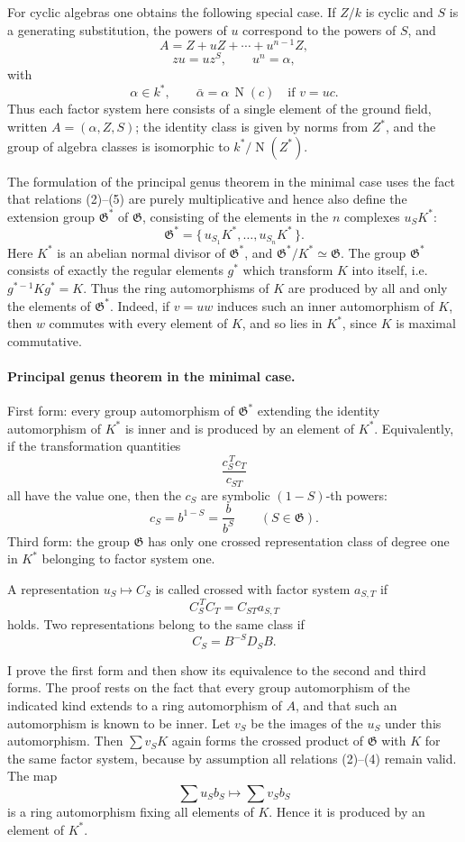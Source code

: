 \documentclass[11pt]{article}
\providecommand{\Norm}{\operatorname{N}}
\providecommand{\Gg}{\mathfrak G}
\begin{document}
For cyclic algebras one obtains the following special case. If \(Z/k\) is cyclic and \(S\) is a generating substitution, the powers of \(u\) correspond to the powers of \(S\), and
\[
        A=Z+uZ+\cdots+u^{n-1}Z,                              \tag{1'}
\]
\[
        zu=uz^S,\qquad u^n=\alpha,                            \tag{2'--3'}
\]
with
\[
        \alpha\in k^*,\qquad
        \bar\alpha=\alpha\,\Norm(c)\quad\text{if }v=uc .       \tag{4'--5'}
\]
Thus each factor system here consists of a single element of the ground field, written \(A=(\alpha,Z,S)\); the identity class is given by norms from \(Z^*\), and the group of algebra classes is isomorphic to \(k^*/\Norm(Z^*)\).

The formulation of the principal genus theorem in the minimal case uses the fact that relations (2)--(5) are purely multiplicative and hence also define the extension group \(\Gg^*\) of \(\Gg\), consisting of the elements in the \(n\) complexes \(u_SK^*\):
\[
        \Gg^*=\{\,u_{S_1}K^*,\ldots,u_{S_n}K^*\,\}.            \tag{6}
\]
Here \(K^*\) is an abelian normal divisor of \(\Gg^*\), and \(\Gg^*/K^*\simeq\Gg\). The group \(\Gg^*\) consists of exactly the regular elements \(g^*\) which transform \(K\) into itself, i.e. \(g^{*-1}Kg^*=K\). Thus the ring automorphisms of \(K\) are produced by all and only the elements of \(\Gg^*\). Indeed, if \(v=uw\) induces such an inner automorphism of \(K\), then \(w\) commutes with every element of \(K\), and so lies in \(K^*\), since \(K\) is maximal commutative.

\paragraph{Principal genus theorem in the minimal case.}
First form: every group automorphism of \(\Gg^*\) extending the identity automorphism of \(K^*\) is inner and is produced by an element of \(K^*\). Equivalently, if the transformation quantities
\[
        \frac{c_S^{\,T}c_T}{c_{ST}}
\]
all have the value one, then the \(c_S\) are symbolic \((1-S)\)-th powers:
\[
        c_S=b^{1-S}=\frac{b}{b^S}\qquad(S\in\Gg).
\]
Third form: the group \(\Gg\) has only one crossed representation class of degree one in \(K^*\) belonging to factor system one.

A representation \(u_S\mapsto C_S\) is called crossed with factor system \(a_{S,T}\) if
\[
        C_S^{\,T}C_T=C_{ST}a_{S,T}
\]
holds. Two representations belong to the same class if
\[
        C_S=B^{-S}D_SB .
\]

I prove the first form and then show its equivalence to the second and third forms. The proof rests on the fact that every group automorphism of the indicated kind extends to a ring automorphism of \(A\), and that such an automorphism is known to be inner. Let \(v_S\) be the images of the \(u_S\) under this automorphism. Then \(\sum v_SK\) again forms the crossed product of \(\Gg\) with \(K\) for the same factor system, because by assumption all relations (2)--(4) remain valid. The map
\[
        \sum u_Sb_S\longmapsto \sum v_Sb_S
\]
is a ring automorphism fixing all elements of \(K\). Hence it is produced by an element of \(K^*\).
\end{document}
